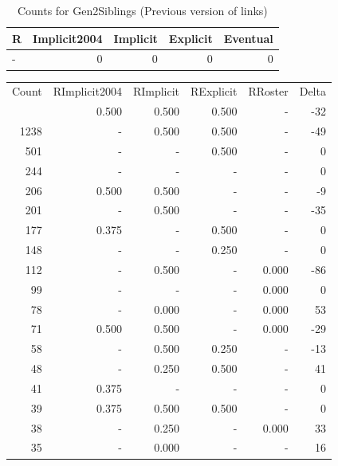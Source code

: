 \documentclass[a4paper]{article}\usepackage[]{graphicx}\usepackage[]{color}
\begin{document}
\begin{table}[ht]
\centering
{\large
\begin{tabular}{lrrrr}
  \hline
R & Implicit2004 & Implicit & Explicit & Eventual \\ 
  \hline
- &   0 &   0 &   0 &   0 \\ 
   \hline
\end{tabular}
}
\caption{Counts for Gen2Siblings (Previous version of links)} 
\end{table}



\begin{table}[ht]
\centering
\begin{tabular}{rrrrrr}
  \hline
Count & RImplicit2004 & RImplicit & RExplicit & RRoster & Delta \\ 
  \rowcolor{goodColor}  \hline
1445 & 0.500 & 0.500 & 0.500 & - & -32 \\ 
   \rowcolor{goodColor} 1238 & - & 0.500 & 0.500 & - & -49 \\ 
   \rowcolor{sosoColor} 501 & - & - & 0.500 & - & 0 \\ 
   \rowcolor{nullColor} 244 & - & - & - & - & 0 \\ 
  206 & 0.500 & 0.500 & - & - & -9 \\ 
  201 & - & 0.500 & - & - & -35 \\ 
   \rowcolor{sosoColor} 177 & 0.375 & - & 0.500 & - & 0 \\ 
   \rowcolor{sosoColor} 148 & - & - & 0.250 & - & 0 \\ 
  112 & - & 0.500 & - & 0.000 & -86 \\ 
   \rowcolor{nullColor} 99 & - & - & - & 0.000 & 0 \\ 
  78 & - & 0.000 & - & 0.000 & 53 \\ 
  71 & 0.500 & 0.500 & - & 0.000 & -29 \\ 
   \rowcolor{badColor} 58 & - & 0.500 & 0.250 & - & -13 \\ 
   \rowcolor{badColor} 48 & - & 0.250 & 0.500 & - & 41 \\ 
   \rowcolor{nullColor} 41 & 0.375 & - & - & - & 0 \\ 
   \rowcolor{goodColor} 39 & 0.375 & 0.500 & 0.500 & - & 0 \\ 
  38 & - & 0.250 & - & 0.000 & 33 \\ 
  35 & - & 0.000 & - & - & 16 \\ 

\end{tabular}
\end{table}
\end{document}
